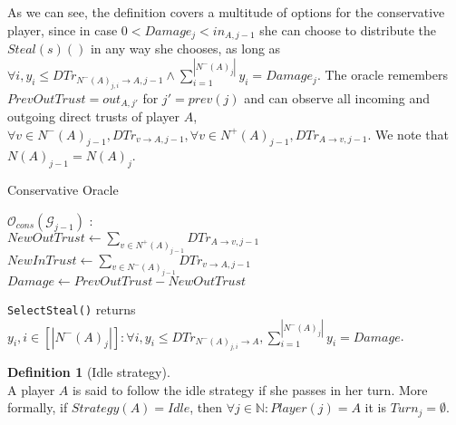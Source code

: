 \documentclass[11pt]{article}
\theoremstyle{definition}
\newtheorem{definition}{Definition}[section]
\theoremstyle{corollary}
\theoremstyle{lemma}
\begin{document}
     As we can see, the definition covers a multitude of options for the conservative player, since in case $0 < Damage_j <
     in_{A,j-1}$ she can choose to distribute the $Steal(s)()$ in any way she chooses, as long as $\forall i, y_i \leq
     DTr_{N^{-}(A)_{j,i} \rightarrow A, j-1} \wedge \sum\limits_{i=1}^{|N^{-}(A)_j|}y_i = Damage_j$.
     The oracle remembers $PrevOutTrust = out_{A, j'}$ for  $j' = prev(j)$ and can observe all incoming and outgoing direct
     trusts of player $A$, $\forall v \in N^{-}(A)_{j-1}, DTr_{v \rightarrow A, j-1}, \forall v \in N^{+}(A)_{j-1},
     DTr_{A \rightarrow v, j-1}$. We note that $N(A)_{j-1} = N(A)_j$. \\
     \begin{algorithm}[H]
        \label{conservativeoracle}
        \caption{Conservative Oracle}
        $\mathcal{O}_{cons}(\mathcal{G}_{j-1})$ : \\ {
           $NewOutTrust \gets \sum\limits_{v \in N^{+}(A)_{j-1}}DTr_{A \rightarrow v, j-1}$ \\
           $NewInTrust \gets \sum\limits_{v \in N^{-}(A)_{j-1}}DTr_{v \rightarrow A, j-1}$ \\
           $Damage \gets PrevOutTrust - NewOutTrust$ \\
           }
     \end{algorithm}
     \texttt{SelectSteal()} returns $y_i, i \in [|N^{-}(A)_j|] : \forall i, y_i \leq DTr_{N^{-}(A)_{j,i} \rightarrow A},
     \sum\limits_{i=1}^{|N^{-}(A)_j|}y_i = Damage$.
     \begin{definition}[Idle strategy] \ \\
        A player $A$ is said to follow the idle strategy if she passes in her turn. More formally, if $Strategy(A) =
        Idle$, then $\forall j \in \mathbb{N} : Player(j) = A$ it is $Turn_j = \emptyset$.
     \end{definition}
\end{document}
